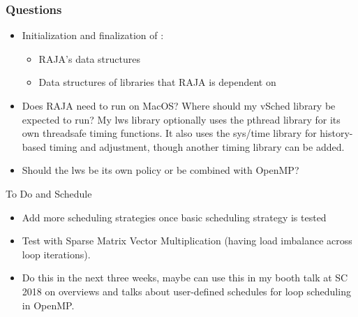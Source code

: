 \documentclass{beamer}
\begin{document}
\begin{frame}
\frametitle{Questions} 
\begin{itemize}
\item Initialization and finalization of :
\begin{itemize} 
\item RAJA's data structures
\item Data structures of libraries that RAJA is dependent on
\end{itemize} 

\item Does RAJA need to run on MacOS? Where should my vSched library be expected to run? My lws library optionally uses the pthread library for its own threadsafe timing functions. It also uses the sys/time library for history-based timing and adjustment, though another timing library can be added.  

\item Should the lws be its own policy or be combined with OpenMP?  

\end{itemize}


\end{frame} 

\begin{frame}{To Do and Schedule}
\begin{itemize}
\item Add more scheduling strategies once basic scheduling strategy is tested
\item Test with Sparse Matrix Vector Multiplication (having load imbalance across loop iterations).
\item Do this in the next three weeks, maybe can use this in my booth talk at SC 2018 on overviews and talks about user-defined schedules for loop scheduling in OpenMP.
\end{itemize}
\end{frame}
\end{document}
